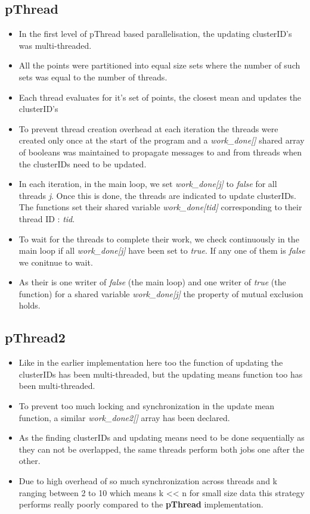 \documentclass[a4paper, 11pt, margin=1in]{article}
\begin{document}
\subsection{pThread}

\begin{itemize}
    \item In the first level of pThread based parallelisation, the updating clusterID's was multi-threaded.
    \item All the points were partitioned into equal size sets where the number of such sets was equal to the number of threads.
    \item Each thread evaluates for it's set of points, the closest mean and updates the clusterID's
    \item To prevent thread creation overhead at each iteration the threads were created only once at the start of the program and a \textit{work\_done[]} shared array of booleans was maintained to propagate messages to and from threads when the clusterIDs need to be updated.
    \item In each iteration, in the main loop, we set \textit{work\_done[j]} to \textit{false} for all threads \textit{j}. Once this is done, the threads are indicated to update clusterIDs. The functions set their shared variable \textit{work\_done[tid]} corresponding to their thread ID : \textit{tid}.
    \item To wait for the threads to complete their work, we check continuously in the main loop if all \textit{work\_done[j]} have been set to \textit{true}. If any one of them is \textit{false} we conitnue to wait.
    \item As their is one writer of \textit{false} (the main loop) and one writer of \textit{true} (the function) for a shared variable \textit{work\_done[j]} the property of mutual exclusion holds.
\end{itemize}

\subsection{pThread2}

\begin{itemize}
    \item Like in the earlier implementation here too the function of updating the clusterIDs has been multi-threaded, but the updating means function too has been multi-threaded.
    \item To prevent too much locking and synchronization in the update mean function, a similar \textit{work\_done2[]} array has been declared.
    \item As the finding clusterIDs and updating means need to be done sequentially as they can not be overlapped, the same threads perform both jobs one after the other.
    \item Due to high overhead of so much synchronization across threads and k ranging between 2 to 10 which means k << n  for small size data this strategy performs really poorly compared to the \textbf{pThread} implementation.
\end{itemize}
\end{document}
